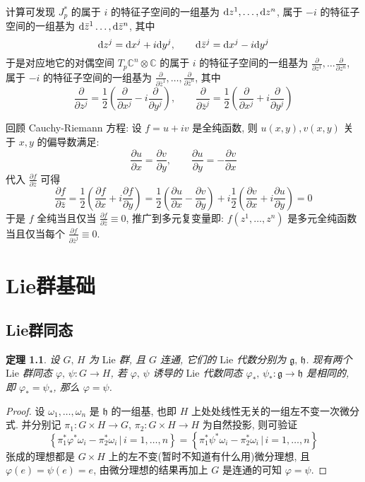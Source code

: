 \documentclass{book}
\newtheorem{theorem}{\indent 定理}[section]
\newcommand{\md}{{\rm d}}
\newcommand{\pd}[2]{\frac{\partial #1}{\partial #2}}
\begin{document}
        计算可发现 $J^*_p$ 的属于 $i$ 的特征子空间的一组基为 $\md{z^1},\dots,\md{z^n}$, 属于 $-i$ 的特征子空间的一组基为 $\md{\bar{z}^1}\dots,\md{\bar{z}^n}$, 其中
        \begin{equation*}
            \md{z^j}=\md{x^j}+i\md{y^j},\qquad \md{\bar{z}^j}=\md{x^j}-i\md{y^j}
        \end{equation*}
        于是对应地它的对偶空间 $T_p\mathbb{C}^n\otimes\mathbb{C}$ 的属于 $i$ 的特征子空间的一组基为 $\pd{}{z^1},\dots\pd{}{z^n}$, 属于 $-i$ 的特征子空间的一组基为 $\pd{}{\bar{z}^1},\dots,\pd{}{\bar{z}^n}$, 其中
        \begin{equation*}
            \pd{}{z^j}=\frac{1}{2}\left(\pd{}{x^j}-i\pd{}{y^j}\right),\qquad \pd{}{\bar{z}^j}=\frac{1}{2}\left(\pd{}{x^j}+i\pd{}{y^j}\right)
        \end{equation*}
        
        回顾 Cauchy-Riemann 方程: 设 $f=u+iv$ 是全纯函数, 则 $u(x,y),v(x,y)$ 关于 $x,y$ 的偏导数满足:
        \begin{equation*}
            \pd{u}{x}=\pd{v}{y},\qquad \pd{u}{y}=-\pd{v}{x}
        \end{equation*}
        代入 $\pd{f}{\bar{z}}$ 可得
        \begin{equation*}
            \pd{f}{\bar{z}}=\frac{1}{2}\left(\pd{f}{x}+i\pd{f}{y}\right)=\frac{1}{2}\left(\pd{u}{x}-\pd{v}{y}\right)+i\frac{1}{2}\left(\pd{v}{x}+i\pd{u}{y}\right)=0
        \end{equation*}
        于是 $f$ 全纯当且仅当 $\pd{f}{\bar{z}}\equiv0$, 推广到多元复变量即: $f(z^1,\dots,z^n)$ 是多元全纯函数当且仅当每个 $\pd{f}{\bar{z}^j}\equiv0$.
        
    \chapter{Lie群基础}
    \section{Lie群同态}
        \begin{theorem}
            设 $G,\,H$ 为 $\mathrm{Lie}$ 群, 且 $G$ 连通, 它们的 $\mathrm{Lie}$ 代数分别为 $\mathfrak{g,\,h}$. 现有两个 $\mathrm{Lie}$ 群同态 $\varphi,\,\psi:G\rightarrow H$, 
            若 $\varphi,\,\psi$ 诱导的 $\mathrm{Lie}$ 代数同态 $\varphi_*,\,\psi_*:\mathfrak{g}\rightarrow\mathfrak{h}$ 是相同的, 即 $\varphi_*=\psi_*$, 那么 $\varphi=\psi$.
        \end{theorem}
        \begin{proof}
            设 $\omega_1,\dots,\omega_n$ 是 $\mathfrak{h}$ 的一组基, 也即 $H$ 上处处线性无关的一组左不变一次微分式.
            并分别记 $\pi_1:G\times H\rightarrow G$, $\pi_2:G\times H\rightarrow H$ 为自然投影, 则可验证
            \begin{equation*}
                \left\{\pi_1^*\varphi^*\omega_i-\pi_2^*\omega_i\,\Big|\,i=1,\dots,n\right\} = \left\{\pi_1^*\psi^*\omega_i-\pi_2^*\omega_i\,\Big|\,i=1,\dots,n\right\}
            \end{equation*}
            张成的理想都是 $G\times H$ 上的左不变(暂时不知道有什么用)微分理想, 且 $\varphi(e) = \psi(e) = e$, 由微分理想的结果再加上 $G$ 是连通的可知 $\varphi = \psi$.
        \end{proof}
\end{document}
